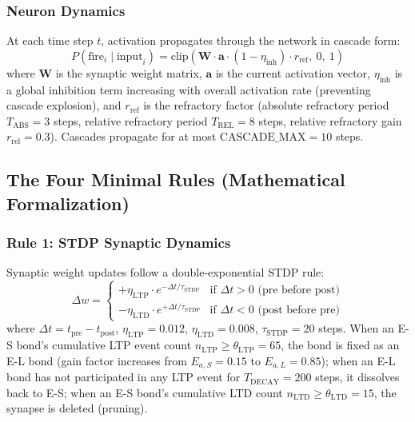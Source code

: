 \documentclass[12pt,a4paper]{article}
\begin{document}
\subsubsection{Neuron Dynamics}
At each time step $t$, activation propagates through the network in cascade form:
\begin{equation}
P(\text{fire}_i \mid \text{input}_i) = \text{clip}\!\left(\mathbf{W} \cdot \mathbf{a} \cdot (1 - \eta_{\text{inh}}) \cdot r_{\text{ref}},\ 0,\ 1\right)
\end{equation}
where $\mathbf{W}$ is the synaptic weight matrix, $\mathbf{a}$ is the current activation vector, $\eta_{\text{inh}}$ is a global inhibition term increasing with overall activation rate (preventing cascade explosion), and $r_{\text{ref}}$ is the refractory factor (absolute refractory period $T_{\text{ABS}}=3$ steps, relative refractory period $T_{\text{REL}}=8$ steps, relative refractory gain $r_{\text{rel}}=0.3$). Cascades propagate for at most $\text{CASCADE\_MAX}=10$ steps.

\subsection{The Four Minimal Rules (Mathematical Formalization)}

\subsubsection{Rule 1: STDP Synaptic Dynamics}
Synaptic weight updates follow a double-exponential STDP rule:
\begin{equation}
\Delta w = \begin{cases}
+\eta_{\text{LTP}} \cdot e^{-\Delta t / \tau_{\text{STDP}}} & \text{if } \Delta t > 0 \text{ (pre before post)} \\
-\eta_{\text{LTD}} \cdot e^{+\Delta t / \tau_{\text{STDP}}} & \text{if } \Delta t < 0 \text{ (post before pre)}
\end{cases}
\label{eq:stdp}
\end{equation}
where $\Delta t = t_{\text{pre}} - t_{\text{post}}$, $\eta_{\text{LTP}}=0.012$, $\eta_{\text{LTD}}=0.008$, $\tau_{\text{STDP}}=20$ steps. When an E-S bond's cumulative LTP event count $n_{\text{LTP}} \geq \theta_{\text{LTP}}=65$, the bond is fixed as an E-L bond (gain factor increases from $E_{a,S}=0.15$ to $E_{a,L}=0.85$); when an E-L bond has not participated in any LTP event for $T_{\text{DECAY}}=200$ steps, it dissolves back to E-S; when an E-S bond's cumulative LTD count $n_{\text{LTD}} \geq \theta_{\text{LTD}}=15$, the synapse is deleted (pruning).
\end{document}
